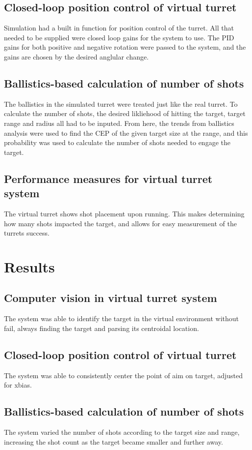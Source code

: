 \documentclass{article}
\begin{document}
\subsection{Closed-loop position control of virtual turret}
Simulation had a built in function for position control of the turret. All that needed to be supplied were closed loop gains for the system to use. The PID gains for both positive and negative rotation were passed to the system, and the gains are chosen by the desired anglular change.
\subsection{Ballistics-based calculation of number of shots}
The ballistics in the simulated turret were treated just like the real turret. To calculate the number of shots, the desired likliehood of hitting the target, target range and radius all had to be inputed. From here, the trends from ballistics analysis were used to find the CEP of the given target size at the range, and this probability was used to calculate the number of shots needed to engage the target.
\subsection{Performance measures for virtual turret system}
The virtual turret shows shot placement upon running. This makes determining how many shots impacted the target, and allows for easy measurement of the turrets success. 
\section{Results}
\subsection{Computer vision in virtual turret system}
The system was able to identify the target in the virtual environment without fail, always finding the target and parsing its centroidal location.


\subsection{Closed-loop position control of virtual turret}
The system was able to consistently center the point of aim on target, adjusted for xbias.
\subsection{Ballistics-based calculation of number of shots}
The system varied the number of shots according to the target size and range, increasing the shot count as the target became smaller and further away.
\end{document}
